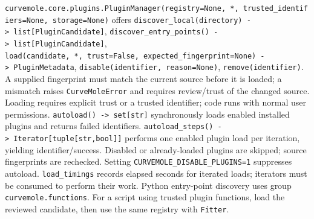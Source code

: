 \documentclass[
  10pt,
  a4paper,
  oneside]{scrreprt}
\begin{document}
\texttt{curvemole.core.plugins.PluginManager(registry=None,\ *,\ trusted\_identifiers=None,\ storage=None)}
offers
\texttt{discover\_local(directory)\ -\textgreater{}\ list{[}PluginCandidate{]}},
\texttt{discover\_entry\_points()\ -\textgreater{}\ list{[}PluginCandidate{]}},
\texttt{load(candidate,\ *,\ trust=False,\ expected\_fingerprint=None)\ -\textgreater{}\ PluginMetadata},
\texttt{disable(identifier,\ reason=None)}, \texttt{remove(identifier)}.
A supplied fingerprint must match the current source before it is
loaded; a mismatch raises \texttt{CurveMoleError} and requires
review/trust of the changed source. Loading requires explicit trust or a
trusted identifier; code runs with normal user permissions.
\texttt{autoload()\ -\textgreater{}\ set{[}str{]}} synchronously loads
enabled installed plugins and returns failed identifiers.
\texttt{autoload\_steps()\ -\textgreater{}\ Iterator{[}tuple{[}str,bool{]}{]}}
performs one enabled plugin load per iteration, yielding
identifier/success. Disabled or already-loaded plugins are skipped;
source fingerprints are rechecked. Setting
\texttt{CURVEMOLE\_DISABLE\_PLUGINS=1} suppresses autoload.
\texttt{load\_timings} records elapsed seconds for iterated loads;
iterators must be consumed to perform their work. Python entry-point
discovery uses group \texttt{curvemole.functions}. For a script using
trusted plugin functions, load the reviewed candidate, then use the same
registry with \texttt{Fitter}.
\end{document}
